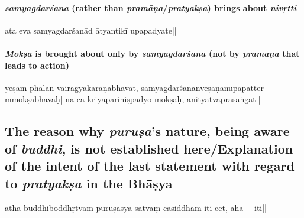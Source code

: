 \paragraph{\emph{samyagdarśana} (rather than \emph{pramāṇa}/\emph{pratyakṣa}) brings about \emph{nivṛtti}}
ata eva  samyagdarśanād \mde ātyantikī  upapadyate||

\paragraph{\emph{Mokṣa} is brought about only by \emph{samyagdarśana} (not by \emph{pramāṇa} that leads to action)}
yeṣām  phalan  
vairāgyakāraṇābhāvāt, samyagdarśanā\mde nveṣaṇānupapatte\mds r mmokṣābhāvaḥ| na ca kriyāpariniṣpādyo mo\-kṣaḥ, anityatvaprasaṅgāt||

\subsection{The reason why \emph{puruṣa}’s nature, being aware of \emph{buddhi}, is not established here/Explanation of the intent of the last statement with regard to \emph{pratyakṣa} in the Bhāṣya}
atha buddhiboddhṛtvam puruṣasya sa\mde tvaṃ cāsiddham iti cet, 
āha---%
%
 iti||\mde%

